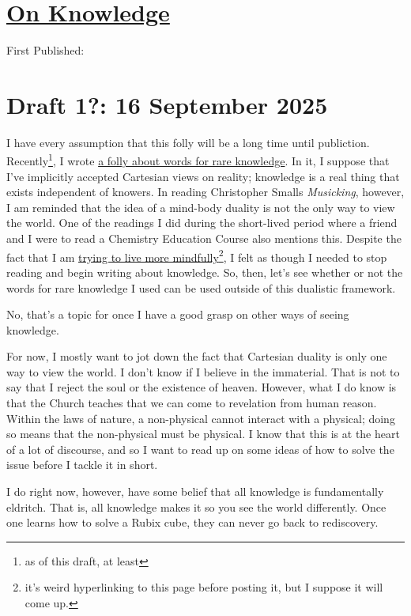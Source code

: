 \documentclass[12pt]{article}
\renewcommand{\,}{\textsuperscript{,}}
\begin{document}
  
\doublespacing  
\section{\href{knowledge.html}{On Knowledge}}  
First Published: 

\section{Draft 1?: 16 September 2025}
I have every assumption that this folly will be a long time until publiction.
Recently\footnote{as of this draft, at least}, I wrote \href{words-rare-knowledge.html}{a folly about words for rare knowledge}.
In it, I suppose that I've implicitly accepted Cartesian views on reality; knowledge is a real thing that exists independent of knowers.
In reading Christopher Smalls \textit{Musicking}, however, I am reminded that the idea of a mind-body duality is not the only way to view the world.
One of the readings I did during the short-lived period where a friend and I were to read a Chemistry Education Course also mentions this.
Despite the fact that I am \href{mindfulness.html}{trying to live more mindfully}\footnote{it's weird hyperlinking to this page before posting it, but I suppose it will come up.}, I felt as though I needed to stop reading and begin writing about knowledge.
So, then, let's see whether or not the words for rare knowledge I used can be used outside of this dualistic framework.

No, that's a topic for once I have a good grasp on other ways of seeing knowledge.

For now, I mostly want to jot down the fact that Cartesian duality is only one way to view the world.
I don't know if I believe in the immaterial.
That is not to say that I reject the soul or the existence of heaven.
However, what I do know is that the Church teaches that we can come to revelation from human reason.
Within the laws of nature, a non-physical cannot interact with a physical; doing so means that the non-physical must be physical.
I know that this is at the heart of a lot of discourse, and so I want to read up on some ideas of how to solve the issue before I tackle it in short.

I do right now, however, have some belief that all knowledge is fundamentally eldritch.
That is, all knowledge makes it so you see the world differently.
Once one learns how to solve a Rubix cube, they can never go back to rediscovery.
\end{document}
